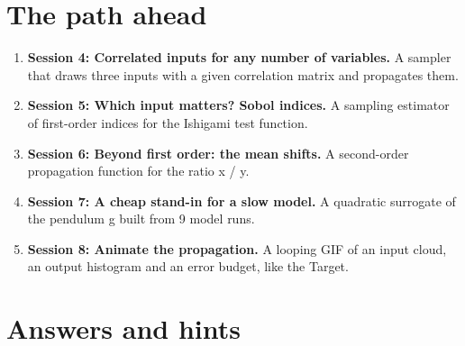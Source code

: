 \documentclass[11pt,a4paper]{article}
\begin{document}
\section{The path ahead}
\begin{enumerate}[nosep]
\item \textbf{Session 4: Correlated inputs for any number of variables.} A sampler that draws three inputs with a given correlation matrix and propagates them.
\item \textbf{Session 5: Which input matters? Sobol indices.} A sampling estimator of first-order indices for the Ishigami test function.
\item \textbf{Session 6: Beyond first order: the mean shifts.} A second-order propagation function for the ratio x / y.
\item \textbf{Session 7: A cheap stand-in for a slow model.} A quadratic surrogate of the pendulum g built from 9 model runs.
\item \textbf{Session 8: Animate the propagation.} A looping GIF of an input cloud, an output histogram and an error budget, like the Target.
\end{enumerate}

\section{Answers and hints}
\end{document}
